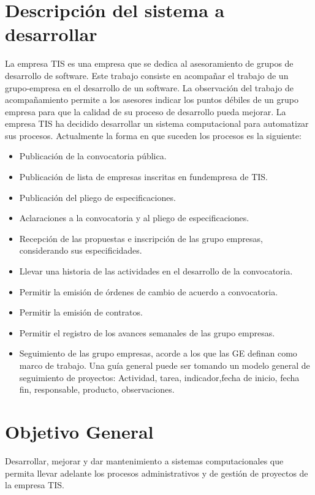 \documentclass[11pt,letterpaper]{report}
\begin{document}
\section{Descripción del sistema a desarrollar}
La empresa TIS es una empresa que se dedica
al asesoramiento de grupos de desarrollo de software. Este trabajo consiste en acompañar el trabajo
de un grupo-empresa en el desarrollo de un software. La observación del trabajo de acompañamiento
permite a los asesores indicar los puntos débiles de un grupo empresa para que la calidad de su
proceso de desarrollo pueda mejorar.
La empresa TIS ha decidido desarrollar un sistema computacional para automatizar sus procesos.
Actualmente la forma en que suceden los procesos es la siguiente:
\begin{itemize}
	\item Publicación de la convocatoria pública.
	\item Publicación de lista de empresas inscritas en fundempresa de TIS.
	\item Publicación del pliego de especificaciones.
	\item Aclaraciones a la convocatoria y al pliego de especificaciones.
	\item Recepción de las propuestas e inscripción de las grupo empresas, considerando sus especificidades.
	\item Llevar una historia de las actividades en el desarrollo de la convocatoria.
	\item Permitir la emisión de  órdenes de cambio de acuerdo a convocatoria.
	\item Permitir la emisión de contratos.
	\item Permitir el registro de los avances semanales de las grupo empresas.
	\item Seguimiento de las grupo empresas, acorde a los que las GE definan como marco de trabajo. Una guía general puede ser tomando un modelo general de seguimiento de proyectos: Actividad, tarea, indicador,fecha de inicio, fecha fin, responsable, producto, observaciones.
\end{itemize}

\section{Objetivo General}



Desarrollar, mejorar y dar mantenimiento a sistemas computacionales que permita llevar adelante los procesos administrativos y de gestión de proyectos de la empresa TIS.
\end{document}
